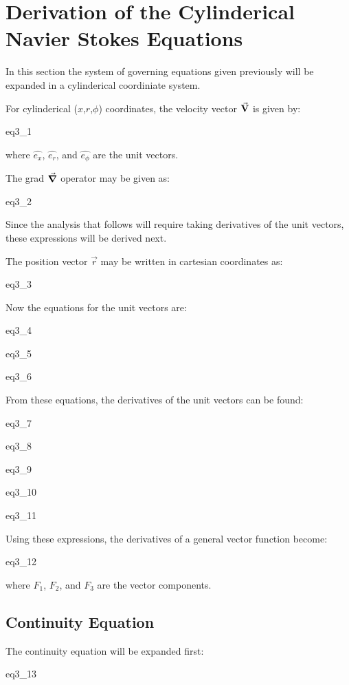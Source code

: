 \section{Derivation of the Cylinderical Navier Stokes Equations}

In this section the system of governing equations given previously will be
expanded in a cylinderical coordiniate system.

For cylinderical ($x$,$r$,$\phi$) coordinates, the velocity vector
$\va{V}$ is given by:

{eq3_1}

where $\hat{e_x}$, $\hat{e_r}$, and $\hat{e_\phi}$ are the unit vectors.

The grad $\grad$ operator may be given as:

{eq3_2}

Since the analysis that follows will require taking derivatives of the unit
vectors, these expressions will be derived next.

The position vector $\overrightarrow{r}$ may be written in cartesian coordinates as:

{eq3_3}

Now the equations for the unit vectors are:

{eq3_4}

{eq3_5}

{eq3_6}

From these equations, the derivatives of the unit vectors can be found:

{eq3_7}

{eq3_8}

{eq3_9}

{eq3_10}

{eq3_11}

Using these expressions, the derivatives of a general vector function become:

{eq3_12}

where $F_1$, $F_2$, and $F_3$ are the vector components.

\subsection{Continuity Equation}

The continuity equation will be expanded first:

{eq3_13}


